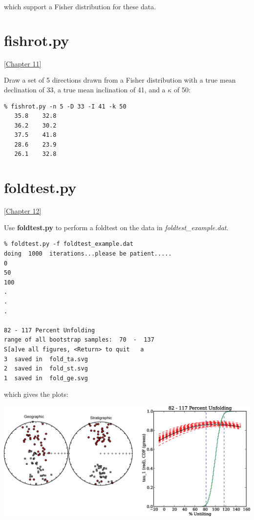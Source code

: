 \documentclass[11pt]{book}
\begin{document}
{{{\noindent which support a Fisher distribution for these data.  



\section {\bf fishrot.py} 
\href{http://Webbook2.html#Fisher_statistics}{ [Chapter 11]}

Draw a set of 5 directions drawn  from a Fisher distribution with a true mean declination of 33, a true mean inclination of 41, and a $\kappa$ of  50:

\begin{verbatim}
% fishrot.py -n 5 -D 33 -I 41 -k 50
   35.8    32.8 
   36.2    30.2 
   37.5    41.8 
   28.6    23.9 
   26.1    32.8 
   \end{verbatim}

 \section {\bf foldtest.py}
 \href{http://Webbook2.html#Beyond_Fisher_statistics}{[Chapter 12]}

 Use {\bf foldtest.py} to perform a foldtest on the data in {\it foldtest\_example.dat}.   
 
 \begin{verbatim}
% foldtest.py -f foldtest_example.dat 
doing  1000  iterations...please be patient.....
0
50
100
.
.
.

82 - 117 Percent Unfolding
range of all bootstrap samples:  70  -  137
S[a]ve all figures, <Return> to quit   a
3  saved in  fold_ta.svg
2  saved in  fold_st.svg
1  saved in  fold_ge.svg
 \end{verbatim}
 
\noindent  which gives the plots:
 
 {%
   \includegraphics[width=14 cm]{EPSfiles/foldtest-ex.eps}}
 
}}}
\end{document}
